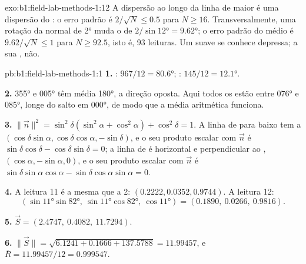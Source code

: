 \begin{solution}{exo:b1:field-lab-methods-1:12}
A dispersão ao longo da linha de maior  é uma dispersão do : o erro padrão é $2/\sqrt N \le 0.5$ para $N \ge 16$. Transversalmente, uma rotação da normal de \ang{2} muda o  de $2/\sin\ang{12} = \ang{9.62}$;
o erro padrão do  médio é $9.62/\sqrt N \le 1$ para
$N \ge 92.5$, isto é, 93 leituras. Um  suave se conhece depressa; a sua , não.
\end{solution}

\begin{solution}{pb:b1:field-lab-methods-1:1}
\textbf{1.} : $967/12 = \ang{80.6}$; : $145/12 =
\ang{12.1}$.

\textbf{2.} \ang{355} e \ang{005} têm média \ang{180}, a direção oposta. Aqui todos os  estão entre \ang{076} e \ang{085}, longe do salto em \ang{000}, de modo que a média aritmética funciona.

\textbf{3.} $\|\vec n\|^2 = \sin^2\delta(\sin^2\alpha + \cos^2\alpha) +
\cos^2\delta = 1$. A linha de  para baixo tem a 
$(\cos\delta\sin\alpha, \cos\delta\cos\alpha, -\sin\delta)$, e o seu produto
escalar com $\vec n$ é $\sin\delta\cos\delta - \cos\delta\sin\delta = 0$; a
linha de  é horizontal e perpendicular ao ,
$(\cos\alpha, -\sin\alpha, 0)$, e o seu produto escalar com $\vec n$ é
$\sin\delta\sin\alpha\cos\alpha - \sin\delta\cos\alpha\sin\alpha = 0$.

\textbf{4.} A leitura 11 é a mesma que a 2: $(0.2222, 0.0352, 0.9744)$.
A leitura 12:
\[
  (\sin\ang{11}\sin\ang{82},\ \sin\ang{11}\cos\ang{82},\ \cos\ang{11}) =
  (0.1890,\ 0.0266,\ 0.9816).
\]

\textbf{5.} $\vec S = (2.4747,\ 0.4082,\ 11.7294)$.

\textbf{6.} $\|\vec S\| = \sqrt{6.1241 + 0.1666 + 137.5788} = 11.99457$, e
$\bar R = 11.99457/12 = 0.999547$.


\end{solution}
